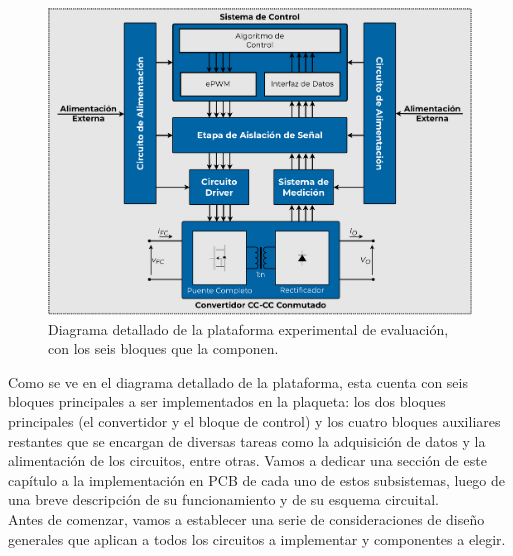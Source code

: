 \begin{figure}[h]
    \centering
    \includegraphics[scale=0.4]{Imagenes/Plataforma Detallada.pdf}
    \caption{Diagrama detallado de la plataforma experimental de evaluación, con los seis bloques que la componen.}
    \label{fig:plataforma_det}
\end{figure}

Como se ve en el diagrama detallado de la plataforma, esta cuenta con seis bloques principales a ser implementados en la plaqueta: los dos bloques principales (el convertidor y el bloque de control) y los cuatro bloques auxiliares restantes que se encargan de diversas tareas como la adquisición de datos y la alimentación de los circuitos, entre otras. Vamos a dedicar una sección de este capítulo a la implementación en PCB de cada uno de estos subsistemas, luego de una breve descripción de su funcionamiento y de su esquema circuital.\\

Antes de comenzar, vamos a establecer una serie de consideraciones de diseño generales que aplican a todos los circuitos a implementar y componentes a elegir.\\



\newpage